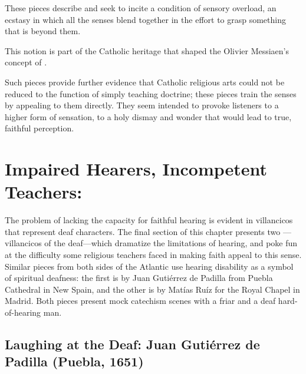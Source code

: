 These pieces describe and seek to incite a condition of sensory overload, an ecstasy in which all the senses blend together in the effort to grasp something that is beyond them.%
  \begin{Footnote}
    This notion is part of the Catholic heritage that shaped the Olivier Messiaen's concept of .
  \end{Footnote}
Such pieces provide further evidence that Catholic religious arts could not be reduced to the function of simply teaching doctrine; these pieces train the senses by appealing to them directly.
They seem intended to provoke listeners to a higher form of sensation, to a holy dismay and wonder that would lead to true, faithful perception.

\section{Impaired Hearers, Incompetent Teachers: }

The problem of lacking the capacity for faithful hearing is evident in
villancicos that represent deaf characters.
The final section of this chapter presents two ---villancicos of the deaf---which dramatize the limitations of hearing, and poke fun at the difficulty some religious teachers faced in making faith appeal to this sense.
Similar pieces from both sides of the Atlantic use hearing disability as a symbol of spiritual deafness: the first is by Juan Gutiérrez de Padilla from Puebla Cathedral in New Spain, and the other is by Matías Ruíz for the Royal Chapel in Madrid.
Both pieces present mock catechism scenes with a friar and a deaf hard-of-hearing man.

\subsection{Laughing at the Deaf: Juan Gutiérrez de Padilla (Puebla, 1651)}


